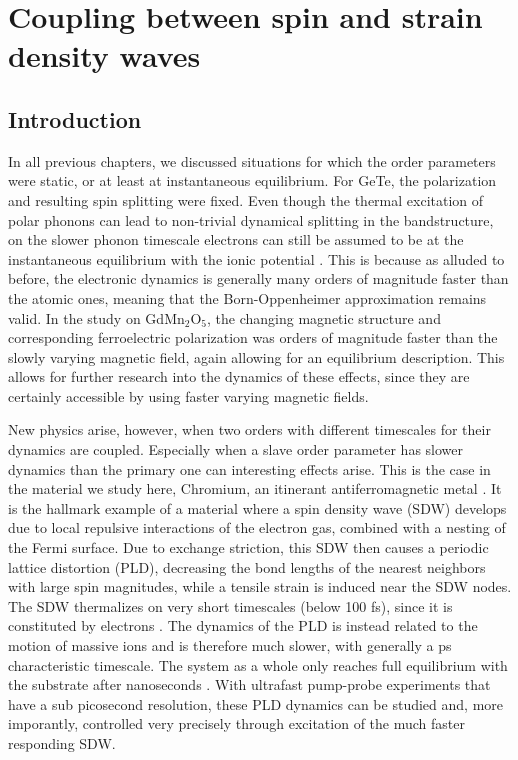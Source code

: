\chapter{Coupling between spin and strain density waves \label{ch:CrSDW}}
\section{Introduction}
In all previous chapters, we discussed situations for which the order parameters were static, or at least at instantaneous equilibrium.
For GeTe, the polarization and resulting spin splitting were fixed.
Even though the thermal excitation of polar phonons can lead to non-trivial dynamical splitting in the bandstructure, on the slower phonon timescale electrons can still be assumed to be at the instantaneous equilibrium with the ionic potential \cite{Monserrat2017}.
This is because as alluded to before, the electronic dynamics is generally many orders of magnitude faster than the atomic ones, meaning that the Born-Oppenheimer approximation remains valid.
In the study on GdMn$_2$O$_5$, the changing magnetic structure and corresponding ferroelectric polarization was orders of magnitude faster than the slowly varying magnetic field, again allowing for an equilibrium description.
This allows for further research into the dynamics of these effects, since they are certainly accessible by using faster varying magnetic fields.

New physics arise, however, when two orders with different timescales for their dynamics are coupled.
Especially when a slave order parameter has slower dynamics than the primary one can interesting effects arise.
This is the case in the material we study here, Chromium, an itinerant antiferromagnetic metal \cite{Kulikov1984,Fawcett1988}.
It is the hallmark example of a material where a spin density wave (SDW) develops due to local repulsive interactions of the electron gas, combined with a nesting of the Fermi surface.
Due to exchange striction, this SDW then causes a periodic lattice distortion (PLD), decreasing the bond lengths of the nearest neighbors with large spin magnitudes, while a tensile strain is induced near the SDW nodes. 
The SDW thermalizes on very short timescales (below 100 fs), since it is constituted by electrons \cite{Nicholson2016}.
The dynamics of the PLD is instead related to the motion of massive ions and is therefore much slower, with generally a ps characteristic timescale.
The system as a whole only reaches full equilibrium with the substrate after nanoseconds \cite{Singer2015prb}. 
With ultrafast pump-probe experiments that have a sub picosecond resolution, these PLD dynamics can be studied and, more imporantly, controlled very precisely through excitation of the much faster responding SDW.

